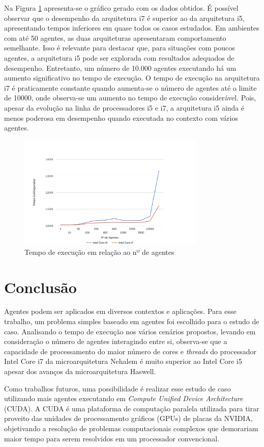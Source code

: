 \documentclass[conference]{IEEEtran}
\begin{document}
        
        Na Figura \ref{grafico} apresenta-se o gráfico gerado com os dados obtidos. É possível observar que o desempenho da arquitetura i7 é superior ao da arquitetura i5, apresentando tempos inferiores em quase todos os casos estudados. Em ambientes com até 50 agentes, as duas arquiteturas apresentaram comportamento semelhante. Isso é relevante para destacar que, para situações com poucos agentes, a arquitetura i5 pode ser explorada com resultados adequados de desempenho. Entretanto, um número de 10.000 agentes executando há um aumento significativo no tempo de execução. O tempo de execução na arquitetura i7 é praticamente constante quando aumenta-se o número de agentes até o limite de 10000, onde observa-se um aumento no tempo de execução considerável. Pois, apesar da evolução na linha de processadores i5 e i7, a arquitetura i5 ainda é menos poderosa em desempenho quando executada no contexto com vários agentes.
        
        \begin{figure}[ht]
        \centering
        \includegraphics[width=3.5in]{grafico.png}
        \caption{Tempo de execução em relação ao nº de agentes}
        \label{grafico}
        \end{figure}
        
        
    \section{Conclusão}

        Agentes podem ser aplicados em diversos contextos e aplicações. Para esse trabalho, um problema simples baseado em agentes foi escolhido para o estudo de caso.  Analisando o tempo de execução nos vários cenários propostos, levando em consideração o número de agentes interagindo entre si, observa-se que a capacidade de processamento do maior número de cores e \textit{threads} do processador Intel Core i7 da microarquitetura Nehalem é muito superior ao Intel Core i5 apesar dos avanços da microarquitetura Haswell. \par
        Como trabalhos futuros, uma possibilidade é realizar esse estudo de caso utilizando mais agentes executando em \textit{Compute Unified Device Architecture} (CUDA). A CUDA é uma plataforma de computação paralela utilizada para tirar proveito das unidades de processamento gráficos (GPUs) de placas da NVIDIA, objetivando a resolução de problemas computacionais complexos que demorariam maior tempo para serem resolvidos em um processador convencional.        
\end{document}
